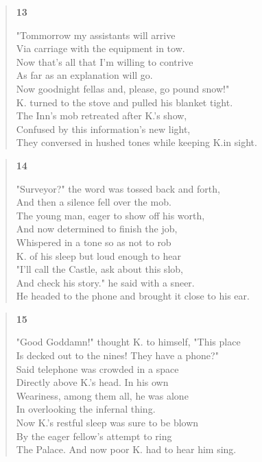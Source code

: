 \documentclass{article}
\begin{document}
\begin{verse}
  \begin{center}
    \textbf{13} \\
  \end{center}
  "Tommorrow my assistants will arrive \\
  Via carriage with the equipment in tow. \\
  Now that's all that I'm willing to contrive \\
  As far as an explanation will go. \\
  Now goodnight fellas and, please, go pound snow!" \\
  K. turned to the stove and pulled his blanket tight. \\
  The Inn's mob retreated after K.'s show, \\
  Confused by this information's new light, \\
  They conversed in hushed tones while keeping K.in sight.
\end{verse}
\begin{verse}
  \begin{center}
    \textbf{14} \\
  \end{center}
  "Surveyor?" the word was tossed back and forth, \\
  And then a silence fell over the mob. \\
  The young man, eager to show off his worth, \\
  And now determined to finish the job, \\
  Whispered in a tone so as not to rob \\
  K. of his sleep but loud enough to hear \\
  "I'll call the Castle, ask about this slob, \\
  And check his story." he said with a sneer. \\
  He headed to the phone and brought it close to his ear.
\end{verse}
\begin{verse}
  \begin{center}
    \textbf{15} \\
  \end{center}
  "Good Goddamn!" thought K. to himself, "This place \\
  Is decked out to the nines! They have a phone?" \\
  Said telephone was crowded in a space \\
  Directly above K.'s head. In his own \\
  Weariness, among them all, he was alone \\
  In overlooking the infernal thing. \\
  Now K.'s restful sleep was sure to be blown \\
  By the eager fellow's attempt to ring \\
  The Palace. And now poor K. had to hear him sing.
\end{verse}
\end{document}
